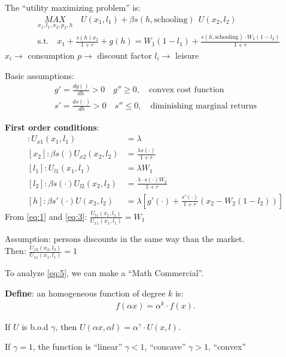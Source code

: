 \documentclass[14pt,notitlepage]{article}
\begin{document}
The ``utility maximizing problem'' is:
\begin{align*}
&\underset{x_1, l_1, x_2, p_2, h}{MAX} \quad U(x_1,l_1) + \beta s(h, \text{schooling})\ \ U(x_2, l_2) \\
&\text{s.t.} \quad x_1 + \frac{s(h)x_2}{1+r} + g(h) = W_1 (1-l_1) + \frac{s(h,\text{schooling})\cdot W_2 (1-l_2)}{1+r}
\end{align*}
 \quad $x_i \rightarrow$ consumption \quad $p \rightarrow$ discount factor \quad $l_i \rightarrow$ leisure

Basic assumptions:
\begin{align*}
g' = \frac{dg()}{dh} > 0 \quad g'' \geq 0, \quad \text{convex cost function} \\
s' = \frac{ds(\cdot)}{dh} > 0 \quad s'' \leq 0, \quad \text{diminishing marginal returns}
\end{align*}

\textbf{First order conditions}:
\begin{align}
[x_1]: U_{x1} (x_1, l_1) &= \lambda \label{eq:1} \\
[x_2]: \beta s() U_{x2} (x_2, l_2) &= \frac{\lambda s(\cdot)}{1+r} \\
[l_1]: U_{l1} (x_1, l_1) &= \lambda W_1 \label{eq:3} \\
[l_2]: \beta s(\cdot) U_{l2} (x_2, l_2) &= \frac{\lambda \cdot s(\cdot) W_2}{1+r} \\
[h]: \beta s'(\cdot) U(x_2, l_2) &= \lambda [g'(\cdot) + \frac{s'(\cdot)}{1+r} (x_2 - W_2(1-l_2))] \label{eq:5}
\end{align}
From \ref{eq:1} and \ref{eq:3}: $\frac{U_{l1}(x_1,l_1)}{U_{x1}(x_1,l_1)} = W_1$

Assumption: persons discounts in the same way than the market. \\
Then: $\frac{U_{x2}(x_2,l_2)}{U_{x1}(x_1,l_1)} = 1$

To analyze \ref{eq:5}, we can make a ``Math Commercial''.

\textbf{Define}: an homogeneous function of degree $k$ is:
\begin{align*}
f(\alpha x) = \alpha^{k} \cdot f(x).
\end{align*}

If $U$ is b.o.d $\gamma$, then $U(\alpha x, \alpha l) = \alpha^{\gamma} \cdot U(x,l)$.

If $\gamma = 1$, the function is ``linear''
   $\gamma < 1$,                 ``concave''
   $\gamma > 1$,                 ``convex''
\end{document}
